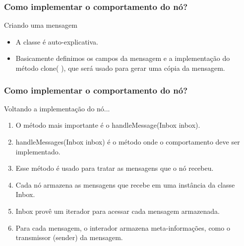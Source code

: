 \documentclass{beamer}
\begin{document}
\begin{frame}
\tiny
	
\end{frame}




\begin{frame}
\frametitle{Como implementar o comportamento do nó?}
	\begin{block}{Criando uma mensagem}
		\begin{itemize}
			\item A classe é auto-explicativa.
			\item Basicamente definimos os campos da mensagem 
					e a implementação do método clone( ), que será 
					usado para gerar uma cópia da mensagem.
		\end{itemize}
	\end{block}
\end{frame}




\begin{frame}
	\frametitle{Como implementar o comportamento do nó?}
	
	\begin{block}{Voltando a implementação do nó...}
		\begin{enumerate}
			\item O método mais importante é o handleMessage(Inbox inbox).
			\item handleMessages(Inbox inbox) é o método onde o comportamento deve ser implementado.
			\item Esse método é usado para tratar as mensagens que o nó recebeu.
			\item Cada nó armazena as mensagens que recebe em uma instância da classe Inbox.
			
			\item Inbox provê um iterador para acessar cada mensagem armazenada.
			
			\item Para cada mensagem, o interador armazena meta-informações, como o transmissor (sender) da mensagem.
		\end{enumerate}
			
	\end{block}	
	
\end{frame}
\end{document}
